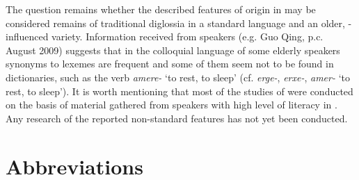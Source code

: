 \documentclass[output=paper,colorlinks,citecolor=brown]{langscibook}
\begin{document}
The question remains whether the described features of  origin in  may be considered remains of traditional diglossia in a standard  language and an older, -influenced  variety. Information received from  speakers (e.g. Guo Qing, p.c. August 2009) suggests that in the colloquial language of some elderly speakers  synonyms to  lexemes are frequent and some of them seem not to be found in  dictionaries, such as the verb \textit{amere-} ‘to rest, to sleep’ (cf.  \textit{erge-},  \textit{erxe-},  \textit{amer-} ‘to rest, to sleep’). It is worth mentioning that most of the studies of  were conducted on the basis of material gathered from speakers with high level of literacy in . Any research of the reported non-standard features has not yet been conducted.


\section*{Abbreviations}
\end{document}
